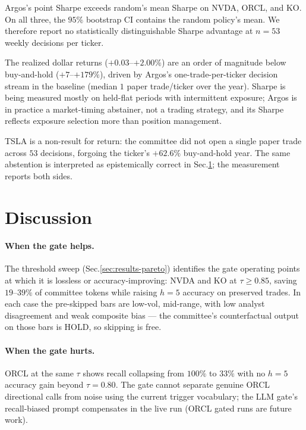 \documentclass[11pt,a4paper]{article}
\begin{document}
Argos's point Sharpe exceeds random's mean Sharpe on NVDA, ORCL, and
KO. On all three, the $95\%$ bootstrap CI contains the random policy's
mean. We therefore report no statistically distinguishable Sharpe
advantage at $n{=}53$ weekly decisions per ticker.

The realized dollar returns ($+0.03$--$+2.00\%$) are an order of
magnitude below buy-and-hold ($+7$--$+179\%$), driven by Argos's
one-trade-per-ticker decision stream in the baseline (median
$1$ paper trade/ticker over the year). Sharpe is being measured
mostly on held-flat periods with intermittent exposure; Argos is in
practice a market-timing abstainer, not a trading strategy, and its
Sharpe reflects exposure selection more than position management.

TSLA is a non-result for return: the committee did not open a single
paper trade across $53$ decisions, forgoing the ticker's $+62.6\%$
buy-and-hold year. The same abstention is interpreted as
epistemically correct in Sec.\ref{sec:discussion}; the measurement
reports both sides.

\section{Discussion}
\label{sec:discussion}

\paragraph{When the gate helps.}
The threshold sweep (Sec.\ref{sec:results-pareto}) identifies the gate
operating points at which it is lossless or accuracy-improving: NVDA
and KO at $\tau \geq 0.85$, saving $19$--$39\%$ of committee tokens
while raising $h{=}5$ accuracy on preserved trades. In each case the
pre-skipped bars are low-vol, mid-range, with low analyst disagreement
and weak composite bias --- the committee's counterfactual output on
those bars is HOLD, so skipping is free.

\paragraph{When the gate hurts.}
ORCL at the same $\tau$ shows recall collapsing from $100\%$ to
$33\%$ with no $h{=}5$ accuracy gain beyond $\tau{=}0.80$. The gate
cannot separate genuine ORCL directional calls from noise using the
current trigger vocabulary; the LLM gate's recall-biased prompt
compensates in the live run (ORCL gated runs are future work).
\end{document}
